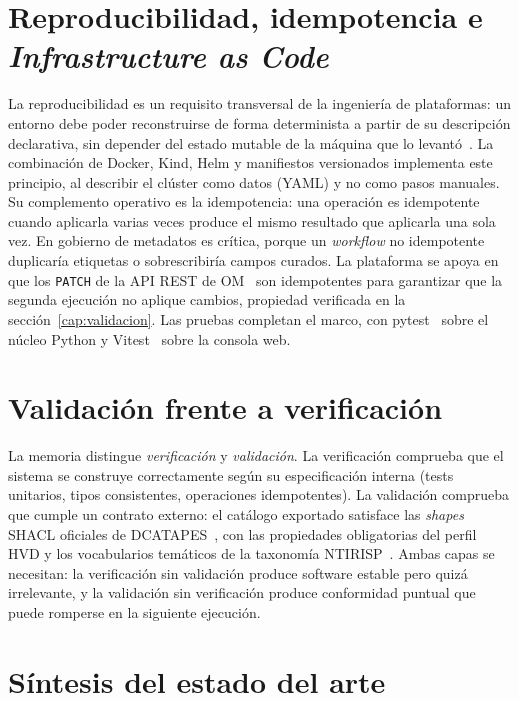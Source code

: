 \section{Reproducibilidad, idempotencia e \emph{Infrastructure as Code}}\label{sec:reproducibilidad}

La reproducibilidad es un requisito transversal de la ingeniería de plataformas: un entorno debe poder reconstruirse de forma determinista a partir de su descripción declarativa, sin depender del estado mutable de la máquina que lo levantó~\cite{kubernetesConcepts}. La combinación de Docker, Kind, Helm y manifiestos versionados implementa este principio, al describir el clúster como datos (\ac{YAML}) y no como pasos manuales. Su complemento operativo es la idempotencia: una operación es idempotente cuando aplicarla varias veces produce el mismo resultado que aplicarla una sola vez. En gobierno de metadatos es crítica, porque un \emph{workflow} no idempotente duplicaría etiquetas o sobrescribiría campos curados. La plataforma se apoya en que los \texttt{PATCH} de la \ac{API} \ac{REST} de \ac{OM}~\cite{openmetadataDocs} son idempotentes para garantizar que la segunda ejecución no aplique cambios, propiedad verificada en la sección~\ref{cap:validacion}. Las pruebas completan el marco, con pytest~\cite{pytestDocs} sobre el núcleo Python y Vitest~\cite{vitestDocs} sobre la consola web.

\section{Validación frente a verificación}\label{sec:validacion-vs-verificacion}

La memoria distingue \emph{verificación} y \emph{validación}. La verificación comprueba que el sistema se construye correctamente según su especificación interna (tests unitarios, tipos consistentes, operaciones idempotentes). La validación comprueba que cumple un contrato externo: el catálogo exportado satisface las \emph{shapes} \ac{SHACL} oficiales de \ac{DCATAPES}~\cite{datosGobValidacionDcatApEs2025}, con las propiedades obligatorias del perfil \ac{HVD} y los vocabularios temáticos de la taxonomía \ac{NTIRISP}~\cite{datosGobNtiRisp}. Ambas capas se necesitan: la verificación sin validación produce software estable pero quizá irrelevante, y la validación sin verificación produce conformidad puntual que puede romperse en la siguiente ejecución.

\section{Síntesis del estado del arte}\label{sec:sintesis-arte}

